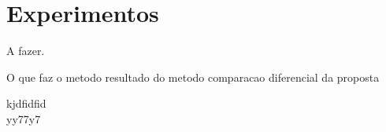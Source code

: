 \chapter{Experimentos}\label{sec:experimentos}
A fazer.

O que faz o metodo
resultado do metodo
comparacao
diferencial da proposta

\citealp*{Ribeiro:2016:WIT:2939672.2939778}kjdfidfid
\\
\cite{Ribeiro2018}yy77y7